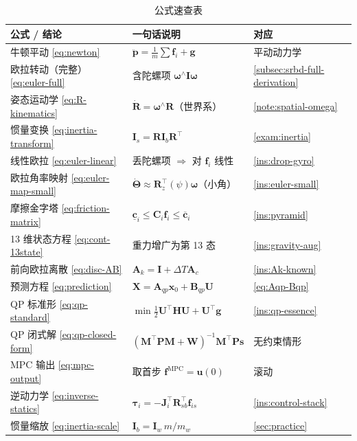\begin{table}[H]\centering\small
\caption{公式速查表}
\begin{tabular}{lll}
\toprule
公式 / 结论 & 一句话说明 & 对应 \\
\midrule
牛顿平动 \cref{eq:newton} & $\ddot{\boldsymbol{p}}=\tfrac1m\sum\mathbf{f}_i+\boldsymbol{g}$ & 平动动力学 \\
欧拉转动（完整）\cref{eq:euler-full} & 含陀螺项 $\boldsymbol{\omega}^\wedge\mathbf{I}\boldsymbol{\omega}$ & \cref{subsec:srbd-full-derivation} \\
姿态运动学 \cref{eq:R-kinematics} & $\dot{\mathbf{R}}=\boldsymbol{\omega}^\wedge\mathbf{R}$（世界系） & \cref{note:spatial-omega} \\
惯量变换 \cref{eq:inertia-transform} & $\mathbf{I}_s=\mathbf{R}\mathbf{I}_b\mathbf{R}^\top$ & \cref{exam:inertia} \\
线性欧拉 \cref{eq:euler-linear} & 丢陀螺项 $\Rightarrow$ 对 $\mathbf{f}_i$ 线性 & \cref{ins:drop-gyro} \\
欧拉角率映射 \cref{eq:euler-map-small} & $\dot{\boldsymbol{\Theta}}\approx\mathbf{R}_z^\top(\psi)\boldsymbol{\omega}$（小角） & \cref{ins:euler-small} \\
摩擦金字塔 \cref{eq:friction-matrix} & $\underline{\mathbf{c}}_i\le\mathbf{C}_i\mathbf{f}_i\le\overline{\mathbf{c}}_i$ & \cref{ins:pyramid} \\
13 维状态方程 \cref{eq:cont-13state} & 重力增广为第 13 态 & \cref{ins:gravity-aug} \\
前向欧拉离散 \cref{eq:disc-AB} & $\mathbf{A}_k=\mathbf{I}+\Delta T\mathbf{A}_c$ & \cref{ins:Ak-known} \\
预测方程 \cref{eq:prediction} & $\mathbf{X}=\mathbf{A}_{qp}\boldsymbol{x}_0+\mathbf{B}_{qp}\mathbf{U}$ & \cref{eq:Aqp-Bqp} \\
QP 标准形 \cref{eq:qp-standard} & $\min\tfrac12\mathbf{U}^\top\mathbf{H}\mathbf{U}+\mathbf{U}^\top\mathbf{g}$ & \cref{ins:qp-essence} \\
QP 闭式解 \cref{eq:qp-closed-form} & $(\mathbf{M}^\top\mathbf{P}\mathbf{M}+\mathbf{W})^{-1}\mathbf{M}^\top\mathbf{P}\mathbf{s}$ & 无约束情形 \\
MPC 输出 \cref{eq:mpc-output} & 取首步 $\mathbf{f}^{\mathrm{MPC}}=\boldsymbol{u}(0)$ & 滚动 \\
逆动力学 \cref{eq:inverse-statics} & $\boldsymbol{\tau}_i=-\mathbf{J}_i^\top\mathbf{R}_{sb}^\top\mathbf{f}_{is}$ & \cref{ins:control-stack} \\
惯量缩放 \cref{eq:inertia-scale} & $\mathbf{I}_b=\mathbf{I}_w\,m/m_w$ & \cref{sec:practice} \\
\bottomrule
\end{tabular}
\end{table}

